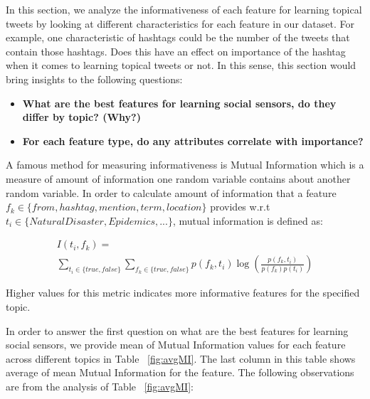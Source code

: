 In this section, we analyze the informativeness of each feature for learning topical tweets by looking at different characteristics for each feature in our dataset. For example, one characteristic of hashtags could be the number of the tweets that contain those hashtags. Does this have an effect on importance of the hashtag when it comes to learning topical tweets or not. In this sense, this section would bring insights to the following questions:

\begin{itemize}
\item \textbf{What are the best features for learning social sensors, do they differ by topic?  (Why?)}
\item \textbf{For each feature type, do any attributes correlate with importance?}
\end{itemize}

A famous method for measuring informativeness is Mutual Information which is a measure of amount of information one random variable contains about another random variable. In order to calculate amount of information that a feature $f_k \in \{from, hashtag, mention, term, location\}$ provides w.r.t $t_i \in \{NaturalDisaster, Epidemics, ...\}$, mutual information is defined as:

\begin{multline}
I(t_i, f_k)= \\
 \sum_{t_i\in \{ true, false \}} \sum_{f_k\in \{ true, false\}}p(f_k,t_i)\log \left ( \frac{p(f_k,t_i)}{p(f_k)p(t_i)} \right )
 \label{eq:eq1}
\end{multline}

Higher values for this metric indicates more informative features for the specified topic.

In order to answer the first question on what are the best features for learning social sensors, we provide mean of Mutual Information values for each feature across different topics in Table ~\ref{fig:avgMI}. The last column in this table shows average of mean Mutual Information for the feature. The following observations are from the analysis of Table ~\ref{fig:avgMI}:

